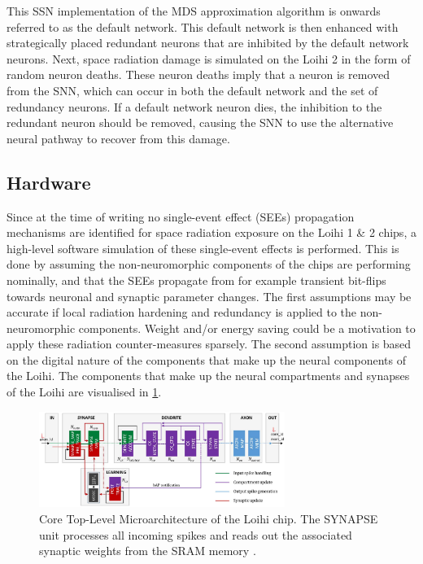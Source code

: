\noindent This SSN implementation of the MDS approximation algorithm is onwards referred to as the default network. This default network is then enhanced with strategically placed redundant neurons that are inhibited by the default network neurons. Next, space radiation damage is simulated on the Loihi 2 in the form of random neuron deaths. These neuron deaths imply that a neuron is removed from the SNN, which can occur in both the default network and the set of redundancy neurons. If a default network neuron dies, the inhibition to the redundant neuron should be removed, causing the SNN to use the alternative neural pathway to recover from this damage.

\subsection{Hardware}\label{subsec:hardware}
Since at the time of writing no single-event effect (SEEs) propagation mechanisms are identified for space radiation exposure on the Loihi 1 \& 2 chips, a high-level software simulation of these single-event effects is performed. This is done by assuming the non-neuromorphic components of the chips are performing nominally, and that the SEEs propagate from for example transient bit-flips towards neuronal and synaptic parameter changes. The first assumptions may be accurate if local radiation hardening and redundancy is applied to the non-neuromorphic components. Weight and/or energy saving could be a motivation to apply these radiation counter-measures sparsely. The second assumption is based on the digital nature of the components that make up the neural components of the Loihi. The components that make up the neural compartments and synapses of the Loihi are visualised in \cref{fig:loihi_micro_architecture}.
\begin{figure}[H]
    \centering
    \includegraphics[width=8cm]{latex/Images/loihi_micro_architecture.png}
    \caption{Core Top-Level Microarchitecture of the Loihi chip. The SYNAPSE unit processes all incoming spikes and
    reads out the associated synaptic weights from the SRAM memory \cite{davies_loihi_2018}
    .}
    \label{fig:loihi_micro_architecture}
\end{figure}




